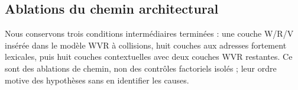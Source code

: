 \subsection{Ablations du chemin architectural}

Nous conservons trois conditions intermédiaires terminées : une couche W/R/V insérée dans le modèle WVR à collisions, huit couches aux adresses fortement lexicales, puis huit couches contextuelles avec deux couches WVR restantes. Ce sont des ablations de chemin, non des contrôles factoriels isolés ; leur ordre motive des hypothèses sans en identifier les causes.

